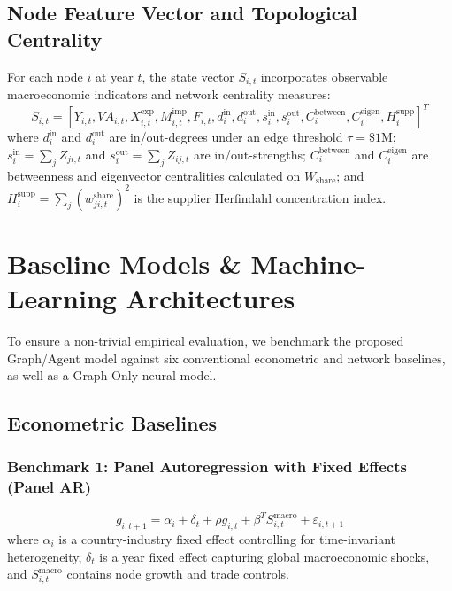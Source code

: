 \documentclass[11pt,a4paper]{article}
\begin{document}
\subsection{Node Feature Vector and Topological Centrality}

For each node $i$ at year $t$, the state vector $S_{i,t}$ incorporates observable macroeconomic indicators and network centrality measures:
\begin{equation}
    S_{i,t} = \left[ Y_{i,t}, VA_{i,t}, X_{i,t}^{\text{exp}}, M_{i,t}^{\text{imp}}, F_{i,t}, d_i^{\text{in}}, d_i^{\text{out}}, s_i^{\text{in}}, s_i^{\text{out}}, C_i^{\text{between}}, C_i^{\text{eigen}}, H_i^{\text{supp}} \right]^T
\end{equation}
where $d_i^{\text{in}}$ and $d_i^{\text{out}}$ are in/out-degrees under an edge threshold $\tau = \$1\text{M}$; $s_i^{\text{in}} = \sum_j Z_{ji,t}$ and $s_i^{\text{out}} = \sum_j Z_{ij,t}$ are in/out-strengths; $C_i^{\text{between}}$ and $C_i^{\text{eigen}}$ are betweenness and eigenvector centralities calculated on $W_{\text{share}}$; and $H_i^{\text{supp}} = \sum_j (w_{ji,t}^{\text{share}})^2$ is the supplier Herfindahl concentration index.

\section{Baseline Models \& Machine-Learning Architectures}
\label{sec:baselines}

To ensure a non-trivial empirical evaluation, we benchmark the proposed Graph/Agent model against six conventional econometric and network baselines, as well as a Graph-Only neural model.

\subsection{Econometric Baselines}

\subsubsection{Benchmark 1: Panel Autoregression with Fixed Effects (Panel AR)}
\begin{equation}
    g_{i,t+1} = \alpha_i + \delta_t + \rho g_{i,t} + \beta^T S_{i,t}^{\text{macro}} + \varepsilon_{i,t+1}
    \label{eq:panel_ar}
\end{equation}
where $\alpha_i$ is a country-industry fixed effect controlling for time-invariant heterogeneity, $\delta_t$ is a year fixed effect capturing global macroeconomic shocks, and $S_{i,t}^{\text{macro}}$ contains node growth and trade controls.
\end{document}
